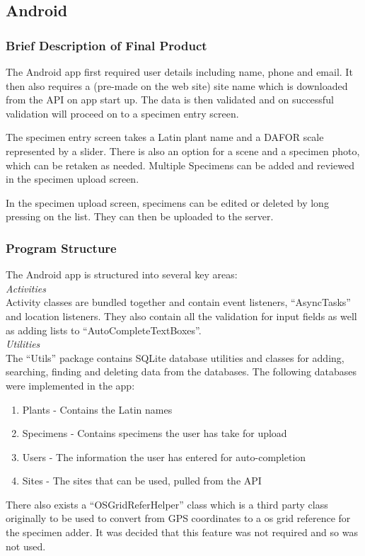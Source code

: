 \subsection{Android}
    \subsubsection{Brief Description of Final Product}
        The Android app first required user details including name, phone and email. It then also requires a (pre-made on the web site) site name which is downloaded from the API on app start up. The data is then validated and on successful validation will proceed on to a specimen entry screen.

        The specimen entry screen takes a Latin plant name and a DAFOR scale represented by a slider. There is also an option for a scene and a specimen photo, which can be retaken as needed. Multiple Specimens can be added and reviewed in the specimen upload screen.

        In the specimen upload screen, specimens can be edited or deleted by long pressing on the list. They can then be uploaded to the server.

    \subsubsection{Program Structure}
        The Android app is structured into several key areas: \\
        
        \emph{Activities}\\
        Activity classes are bundled together and contain event listeners, ``AsyncTasks'' and location listeners. They also contain all the validation for input fields as well as adding lists to ``AutoCompleteTextBoxes''. \\

        \emph{Utilities}\\
        The ``Utils'' package contains SQLite database utilities and classes for adding, searching, finding and deleting data from the databases. The following databases were implemented in the app:
        \begin{enumerate}
            \item Plants - Contains the Latin names
            \item Specimens - Contains specimens the user has take for upload
            \item Users - The information the user has entered for auto-completion
            \item Sites - The sites that can be used, pulled from the API
        \end{enumerate}
        There also exists a ``OSGridReferHelper'' class which is a third party class originally to be used to convert from GPS coordinates to a os grid reference for the specimen adder. It was decided that this feature was not required and so was not used.\\

